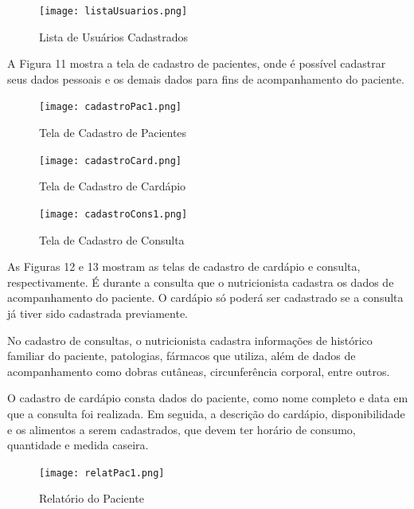 \begin{figure} [hbt]
\begin{center}
\texttt{[image: listaUsuarios.png]}
\end{center}
\label{listUser} 
\caption{Lista de Usuários Cadastrados}
\end{figure}

A Figura 11 mostra a tela de cadastro de pacientes, onde é possível cadastrar
seus dados pessoais e os demais dados para fins de acompanhamento do paciente. 

\begin{figure} [hbt]
\begin{center}
\texttt{[image: cadastroPac1.png]}
\end{center}
\label{cadastroPac} 
\caption{Tela de Cadastro de Pacientes}
\end{figure}

\begin{figure} [hbt]
\begin{center}
\texttt{[image: cadastroCard.png]}
\end{center}
\label{cadastroCard} 
\caption{Tela de Cadastro de Cardápio}
\end{figure}

\begin{figure} [hbt]
\begin{center}
\texttt{[image: cadastroCons1.png]}
\end{center}
\label{cadastroCons} 
\caption{Tela de Cadastro de Consulta}
\end{figure}

As Figuras 12 e 13 mostram as telas de cadastro de cardápio e consulta,
respectivamente. É durante a consulta que o nutricionista cadastra os dados de
acompanhamento do paciente. O cardápio só poderá ser cadastrado se a consulta já
tiver sido cadastrada previamente.

No cadastro de consultas, o nutricionista cadastra informações de histórico
familiar do paciente, patologias, fármacos que utiliza, além de dados de
acompanhamento como dobras cutâneas, circunferência corporal, entre outros.

O cadastro de cardápio consta dados do paciente, como nome completo e data
em que a consulta foi realizada. Em seguida, a descrição do cardápio, disponibilidade
e os alimentos a serem cadastrados, que devem ter horário de consumo, quantidade
e medida caseira.

\begin{figure} [hbt]
\label{relatPac} 
\caption{Relatório do Paciente}
\begin{center}
\texttt{[image: relatPac1.png]}
\end{center}
\end{figure}

